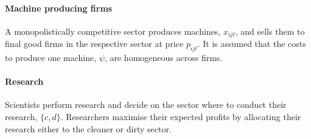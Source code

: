 \paragraph{Machine producing firms}
A monopolistically competitive sector produces machines, $x_{ijt}$, and sells them to final good firms in the respective sector at price $p_{ijt}$. It is assumed that the costs to produce one machine, $\psi$, are homogeneous across firms.
 \paragraph{Research}
 Scientists perform research and decide on the sector where to conduct their research, $\{c,d\}$. 
 Researchers maximise their expected profits by allocating their research either to the cleaner or dirty sector. 
 
